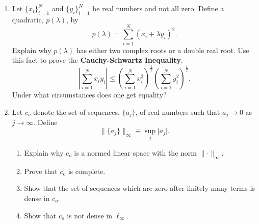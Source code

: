 \documentclass{article}
\begin{document}
\begin{enumerate}
\begin{enumerate}
\begin{proof}
\begin{align*}
                                    \\
                                    \therefore\lVert x\rVert_2 & \leq \lVert x\rVert_1\leq \lVert x\rVert_2
                              \end{align*}
                        \end{proof}
                  \item Prove that the sup norm and the $L_1$ norm are not
                        equivalent on $C[a,b]$.
                        \begin{proof}
                        \end{proof}
            \end{enumerate}
            \setcounter{enumi}{9}
      \item Let $\{x_i\}_{i=1}^N$ and $\{y_i\}_{i=1}^N$ be real numbers and not
            all zero. Define a quadratic, $p(\lambda)$, by
            \[
                  p(\lambda)=\sum_{i=1}^N(x_i+\lambda y_i)^2.
            \]
            Explain why $p(\lambda)$ has either two complex roots or a double
            real root. Use this fact to prove the \textbf{Cauchy-Schwartz
                  Inequality}.
            \begin{equation}
                  \left\lvert\sum_{i=1}^Nx_iy_i\right\rvert \leq
                  \left(\sum_{i=1}^Nx_i^2\right)^\frac{1}{2}
                  \left(\sum_{i=1}^Ny_i^2\right)^\frac{1}{2}.
            \end{equation}
            Under what circumstances does one get equality?
      \item Let $c_o$ denote the set of sequences, $\{a_j\}$, of real numbers such
            that $a_j\to 0$ as $j\to \infty$. Define
            \[
                  \lVert\{a_j\}\rVert_\infty\equiv\sup_j\lvert a_j\rvert.
            \]
            \begin{enumerate}
                  \item Explain why $c_o$ is a normed linear space with the norm
                        $\lVert\cdot\rVert_\infty$.
                  \item Prove that $c_o$ is complete.
                  \item Show that the set of sequences which are zero after
                        finitely many terms is dense in $c_o$.
                  \item Show that $c_o$ is not dense in $\ell_\infty$.
            \end{enumerate}

\end{enumerate}
\end{document}
